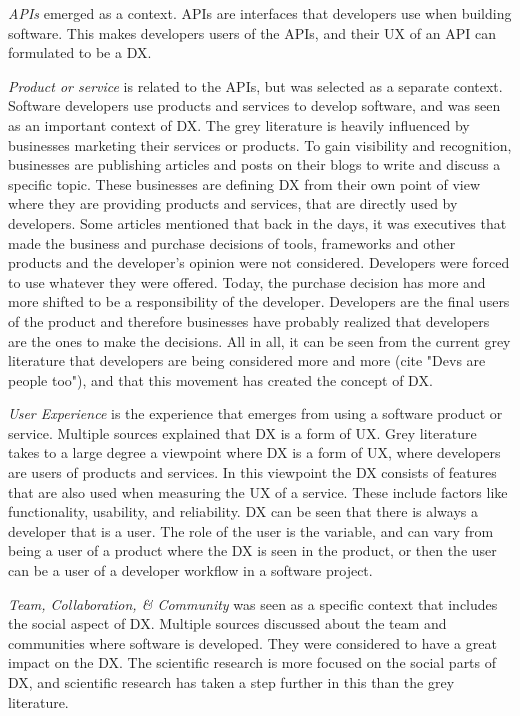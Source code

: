\documentclass[english, 12pt, a4paper, sci, utf8, a-1b, online]{aaltothesis}
\begin{document}
\textit{APIs} emerged as a context. APIs are interfaces that developers use when building software. This makes developers users of the APIs, and their UX of an API can formulated to be a DX.

\textit{Product or service} is related to the APIs, but was selected as a separate context. Software developers use products and services to develop software, and was seen as an important context of DX. The grey literature is heavily influenced by businesses marketing their services or products. To gain visibility and recognition, businesses are publishing articles and posts on their blogs to write and discuss a specific topic. These businesses are defining DX from their own point of view where they are providing products and services, that are directly used by developers. Some articles mentioned that back in the days, it was executives that made the business and purchase decisions of tools, frameworks and other products and the developer's opinion were not considered. Developers were forced to use whatever they were offered. Today, the purchase decision has more and more shifted to be a responsibility of the developer. Developers are the final users of the product and therefore businesses have probably realized that developers are the ones to make the decisions. All in all, it can be seen from the current grey literature that developers are being considered more and more (cite "Devs are people too"), and that this movement has created the concept of DX.

\textit{User Experience} is the experience that emerges from using a software product or service. Multiple sources explained that DX is a form of UX. Grey literature takes to a large degree a viewpoint where DX is a form of UX, where developers are users of products and services. In this viewpoint the DX consists of features that are also used when measuring the UX of a service. These include factors like functionality, usability, and reliability. DX can be seen that there is always a developer that is a user. The role of the user is the variable, and can vary from being a user of a product where the DX is seen in the product, or then the user can be a user of a developer workflow in a software project.

\textit{Team, Collaboration, \& Community} was seen as a specific context that includes the social aspect of DX. Multiple sources discussed about the team and communities where software is developed. They were considered to have a great impact on the DX. The scientific research is more focused on the social parts of DX, and scientific research has taken a step further in this than the grey literature.
\end{document}
